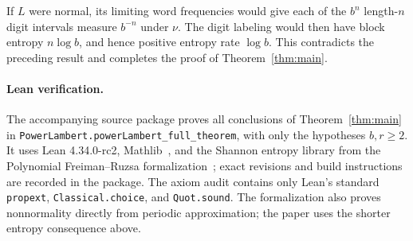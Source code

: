 \documentclass[11pt]{article}
\begin{document}
If $L$ were normal, its limiting word frequencies would give each of
the $b^n$ length-$n$ digit intervals measure $b^{-n}$ under $\nu$.
The digit labeling would then have block entropy $n\log b$, and hence
positive entropy rate $\log b$. This contradicts the preceding result
and completes the proof of Theorem~\ref{thm:main}.

\paragraph{Lean verification.}
The accompanying source package proves all conclusions of
Theorem~\ref{thm:main} in
\texttt{PowerLambert.powerLambert\_full\_theorem}, with only the
hypotheses $b,r\ge2$. It uses Lean 4.34.0-rc2, Mathlib~\cite{Mathlib},
and the Shannon entropy library from the Polynomial Freiman--Ruzsa
formalization~\cite{PFR}; exact revisions and build instructions are
recorded in the package. The axiom audit contains only Lean's standard
\texttt{propext}, \texttt{Classical.choice}, and \texttt{Quot.sound}.
The formalization also proves nonnormality directly from periodic
approximation; the paper uses the shorter entropy consequence above.
\end{document}
